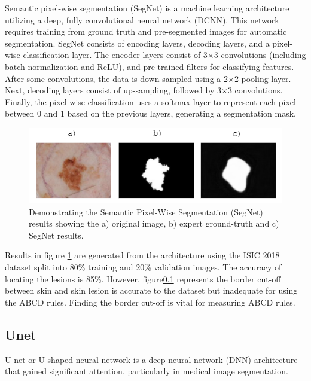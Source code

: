 Semantic pixel-wise segmentation (SegNet) is a machine learning architecture utilizing a deep, fully convolutional neural network (DCNN). This network requires training from ground truth and pre-segmented images for automatic segmentation. SegNet consists of encoding layers, decoding layers, and a pixel-wise classification layer. The encoder layers consist of 3$\times$3 convolutions (including batch normalization and ReLU), and pre-trained filters for classifying features. After some convolutions, the data is down-sampled using a 2$\times$2 pooling layer. Next, decoding layers consist of up-sampling, followed by 3$\times$3 convolutions. Finally, the pixel-wise classification uses a softmax layer to represent each pixel between 0 and 1 based on the previous layers, generating a segmentation mask.




\begin{figure}[hb]
\centering
\includegraphics[scale=1.2]{images/border-seg.png}
\caption{Demonstrating the Semantic Pixel-Wise Segmentation (SegNet) results showing the a) original image, b) expert ground-truth and c) SegNet results.}\label{SegNet}
\end{figure}

Results in figure \ref{SegNet} are generated from the architecture using the ISIC 2018 dataset split into 80\% training and 20\% validation images. The accuracy of locating the lesions is 85\%. However, figure\ref{} represents the border cut-off between skin and skin lesion is accurate to the dataset but inadequate for using the ABCD rules. Finding the border cut-off is vital for measuring ABCD rules\cite{Pereira2020}.



\subsection{Unet}
U-net or U-shaped neural network is a deep neural network (DNN) architecture that gained significant attention, particularly in medical image segmentation. 



